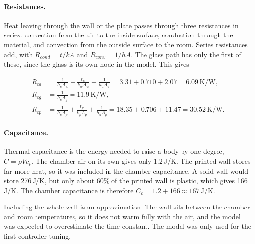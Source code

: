 \paragraph{Resistances.}
Heat leaving through the wall or the plate passes through three resistances in series: convection from the air to the inside surface, conduction through the material, and convection from the outside surface to the room. Series resistances add, with $R_{cond} = t/kA$ and $R_{conv} = 1/hA$. The glass path has only the first of these, since the glass is its own node in the model. This gives

\begin{align}
R_{ca} &= \frac{1}{h_c A_w} + \frac{t_w}{k_w A_w} + \frac{1}{h_a A_w} = 3.31 + 0.710 + 2.07 = 6.09\,\text{K/W}, \label{eq:rca} \\[4pt]
R_{cg} &= \frac{1}{h_c A_g} = 11.9\,\text{K/W}, \label{eq:rcg} \\[4pt]
R_{cp} &= \frac{1}{h_c A_p} + \frac{t_p}{k_p A_p} + \frac{1}{h_a A_p} = 18.35 + 0.706 + 11.47 = 30.52\,\text{K/W}. \label{eq:rcp}
\end{align}

\paragraph{Capacitance.}
Thermal capacitance is the energy needed to raise a body by one degree, $C = \rho V c_p$. The chamber air on its own gives only 1.2\,J/K. The printed wall stores far more heat, so it was included in the chamber capacitance. A solid wall would store 276\,J/K, but only about 60\% of the printed wall is plastic, which gives 166\,J/K. The chamber capacitance is therefore $C_c = 1.2 + 166 \approx 167$\,J/K.

Including the whole wall is an approximation. The wall sits between the chamber and room temperatures, so it does not warm fully with the air, and the model was expected to overestimate the time constant. The model was only used for the first controller tuning.

